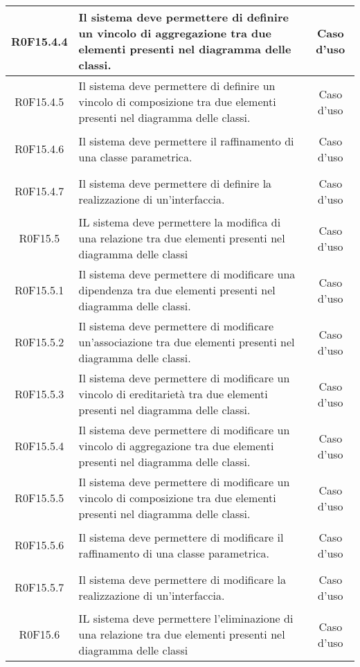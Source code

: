 \documentclass[../AnalisiDeiRequisiti.tex]{subfiles}
\begin{document}
\begin{longtable}{|c|>{\centering}p{7cm}|c|}
	\hypertarget{R0F15.4.4}{R0F15.4.4} & Il sistema deve permettere di definire un vincolo di aggregazione tra due elementi presenti nel diagramma delle classi. & Caso d'uso \\ \hline
	\hypertarget{R0F15.4.5}{R0F15.4.5} & Il sistema deve permettere di definire un vincolo di composizione tra due elementi presenti nel diagramma delle classi. & Caso d'uso \\ \hline
	\hypertarget{R0F15.4.6}{R0F15.4.6} & Il sistema deve permettere il raffinamento di una classe parametrica. & Caso d'uso \\ \hline
	\hypertarget{R0F15.4.7}{R0F15.4.7} & Il sistema deve permettere di definire la realizzazione di un'interfaccia. & Caso d'uso \\ \hline
	\hypertarget{R0F15.5}{R0F15.5} & IL sistema deve permettere la modifica di una relazione tra due elementi presenti nel diagramma delle classi & Caso d'uso \\ \hline
	\hypertarget{R0F15.5.1}{R0F15.5.1} & Il sistema deve permettere di modificare una dipendenza tra due elementi presenti nel diagramma delle classi. & Caso d'uso \\ \hline
	\hypertarget{R0F15.5.2}{R0F15.5.2} & Il sistema deve permettere di modificare un'associazione tra due elementi presenti nel diagramma delle classi. & Caso d'uso \\ \hline
	\hypertarget{R0F15.5.3}{R0F15.5.3} & Il sistema deve permettere di modificare un vincolo di ereditarietà tra due elementi presenti nel diagramma delle classi. & Caso d'uso \\ \hline
	\hypertarget{R0F15.5.4}{R0F15.5.4} & Il sistema deve permettere di modificare un vincolo di aggregazione tra due elementi presenti nel diagramma delle classi. & Caso d'uso \\ \hline
	\hypertarget{R0F15.5.5}{R0F15.5.5} & Il sistema deve permettere di modificare un vincolo di composizione tra due elementi presenti nel diagramma delle classi. & Caso d'uso \\ \hline
	\hypertarget{R0F15.5.6}{R0F15.5.6} & Il sistema deve permettere di modificare il raffinamento di una classe parametrica.  & Caso d'uso \\ \hline
	\hypertarget{R0F15.5.7}{R0F15.5.7} & Il sistema deve permettere di modificare la realizzazione di un'interfaccia. & Caso d'uso \\ \hline
	\hypertarget{R0F15.6}{R0F15.6} & IL sistema deve permettere l'eliminazione di una relazione tra due elementi presenti nel diagramma delle classi & Caso d'uso \\ \hline

\end{longtable}
\end{document}
